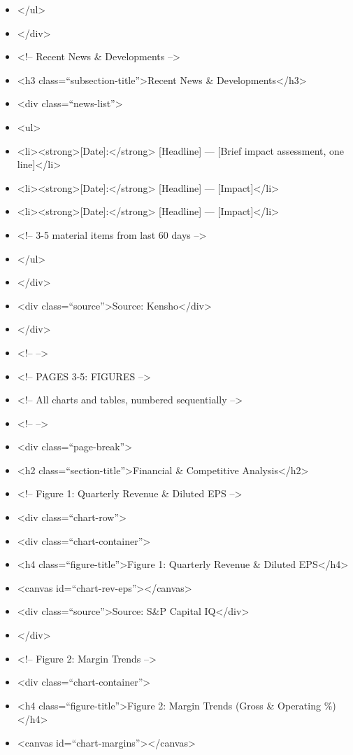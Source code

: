 \documentclass[11pt]{article}
\begin{document}
\begin{itemize}[leftmargin=*,itemsep=2pt,topsep=2pt]
\item {} </ul>
\item {} </div>
\item {} <!-- Recent News \& Developments -->
\item {} <h3 class=``subsection-title''>Recent News \& Developments</h3>
\item {} <div class=``news-list''>
\item {} <ul>
\item {} <li><strong>[Date]:</strong> [Headline] — [Brief impact assessment, one line]</li>
\item {} <li><strong>[Date]:</strong> [Headline] — [Impact]</li>
\item {} <li><strong>[Date]:</strong> [Headline] — [Impact]</li>
\item {} <!-- 3-5 material items from last 60 days -->
\item {} </ul>
\item {} </div>
\item {} <div class=``source''>Source: Kensho</div>
\item {} </div>
\item {} <!-- -->
\item {} <!-- PAGES 3-5: FIGURES -->
\item {} <!-- All charts and tables, numbered sequentially -->
\item {} <!-- -->
\item {} <div class=``page-break''>
\item {} <h2 class=``section-title''>Financial \& Competitive Analysis</h2>
\item {} <!-- Figure 1: Quarterly Revenue \& Diluted EPS -->
\item {} <div class=``chart-row''>
\item {} <div class=``chart-container''>
\item {} <h4 class=``figure-title''>Figure 1: Quarterly Revenue \& Diluted EPS</h4>
\item {} <canvas id=``chart-rev-eps''></canvas>
\item {} <div class=``source''>Source: S\&P Capital IQ</div>
\item {} </div>
\item {} <!-- Figure 2: Margin Trends -->
\item {} <div class=``chart-container''>
\item {} <h4 class=``figure-title''>Figure 2: Margin Trends (Gross \& Operating \%)</h4>
\item {} <canvas id=``chart-margins''></canvas>

\end{itemize}
\end{document}
